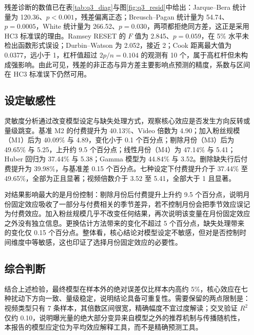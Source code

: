残差诊断的数值已在表\ref{tab:q3_diag}与图\ref{fig:q3_resid}中给出：Jarque--Bera 统计量为 120.36、$p<0.001$，残差偏离正态；Breusch--Pagan 统计量为 54.74、$p=0.0005$，White 统计量为 266.52、$p=0.030$，两项都拒绝同方差，这正是采用 HC3 标准误的理由。Ramsey RESET 的 $F$ 值为 2.845、$p=0.059$，在 5\% 水平未检出函数形式误设；Durbin--Watson 为 2.052，接近 2；Cook 距离最大值为 0.0377，远小于 1，杠杆值超过 $2p/n=0.104$ 的观测有 10 个，属于高杠杆但未构成强影响。由此可见，残差的非正态与异方差主要影响点预测的精度，系数与区间在 HC3 标准误下仍然可用。

\subsection{设定敏感性}

灵敏度分析通过改变模型设定与缺失处理方式，观察核心效应是否发生方向反转或量级跳变。基准 M2 的付费提升为 40.13\%、Video 倍数为 4.90；加入粉丝规模（M1）后为 40.09\% 与 4.89，变化小于 0.1 个百分点；剔除月份（M3）后为 49.65\% 与 5.25，上升约 9.5 个百分点；线性月份（M4）为 47.14\% 与 5.41；Huber 回归为 37.44\% 与 5.38；Gamma 模型为 44.84\% 与 3.52。删除缺失行后付费提升为 39.98\%，与基准差 0.15 个百分点。七种设定下付费提升介于 37.44\% 至 49.65\%，全部为正且显著；视频倍数介于 3.52 至 5.41，全部大于 1 且显著。

对结果影响最大的是月份控制：剔除月份后付费提升上升约 9.5 个百分点，说明月份固定效应吸收了一部分与付费相关的季节差异，若不控制月份会把季节效应误记为付费效应。加入粉丝规模几乎不改变任何结果，再次说明该变量在月份固定效应之外没有独立信息。更换估计方法带来的变化不超过 5 个百分点，缺失处理带来的变化仅 0.15 个百分点。整体看，核心结论对模型设定不敏感，但对是否控制时间维度中等敏感，这也印证了选择月份固定效应的必要性。

\subsection{综合判断}

结合上述检验，最终模型在样本外的绝对误差仅比样本内高约 5\%，核心效应在七种扰动下方向一致、量级稳定，说明结论具备可重复性。需要保留的两点限制是：视频类型只有 7 条样本，其倍数区间很宽，精确幅度不宜过度解读；交叉验证 $R^2$ 仅约 0.10，说明曝光量的绝大部分变异来自模型之外的推荐机制与传播随机性，本报告的模型应定位为平均效应解释工具，而不是精确预测工具。
